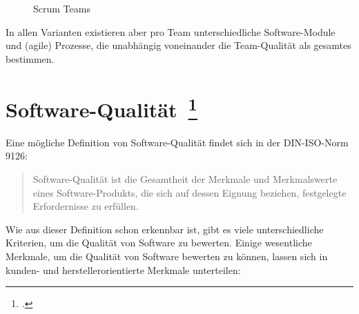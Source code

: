 \begin{savenotes}
  \begin{figure}[H]
    \centering
  \caption{Scrum Teams}\label{fig:Scrum Teams}
  \end{figure}
\end{savenotes}

In allen Varianten existieren aber pro Team unterschiedliche Software-Module und (agile) Prozesse, die unabhängig voneinander die Team-Qualität als gesamtes bestimmen.

\clearpage
\section[Software-Qualität]{Software-Qualität~\footcite[vgl.][Kapitel 1.2]{hoffmann_software_qualitat_2013}}

Eine mögliche Definition von Software-Qualität findet sich in der DIN-ISO-Norm 9126:

\begin{quote}
  Software-Qualität ist die Gesamtheit der Merkmale und Merkmalswerte eines Software-Produkts, die sich auf dessen Eignung beziehen, festgelegte Erfordernisse zu erfüllen.
\end{quote}

Wie aus dieser Definition schon erkennbar ist, gibt es viele unterschiedliche Kriterien, um die Qualität von Software zu bewerten.
Einige wesentliche Merkmale, um die Qualität von Software bewerten zu können, lassen sich in kunden- und herstellerorientierte Merkmale unterteilen:


